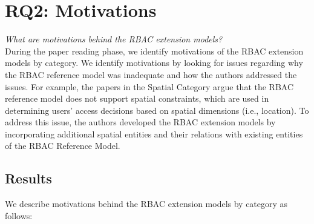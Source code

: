 \section{RQ2: Motivations} \label{sec:motivations}

\textit{What are motivations behind the RBAC extension models?}
\\

During the paper reading phase, we identify motivations of the RBAC extension models by category. 
We identify motivations by looking for issues regarding why the RBAC reference model was inadequate and how the authors addressed the issues. 
For example, the papers in the Spatial Category argue that the RBAC reference model does not support spatial constraints, which are used in determining users' access decisions based on spatial dimensions (i.e., location). 
To address this issue, the authors developed the RBAC extension models by incorporating additional spatial entities and their relations with existing entities of the RBAC Reference Model. 


\subsection{Results}

We describe motivations behind the RBAC extension models by category as follows:


